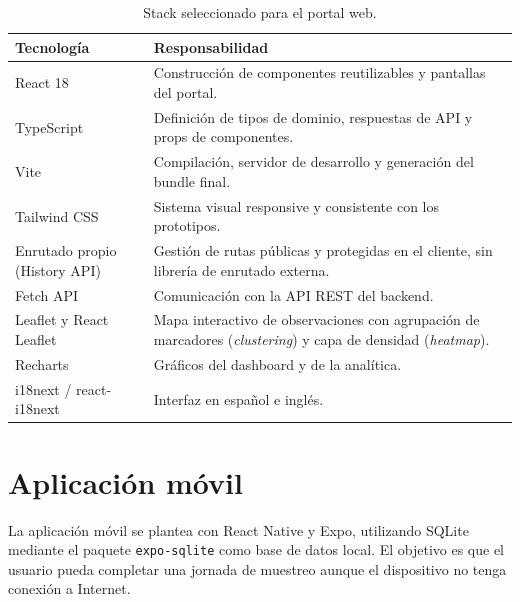 \begin{table}[H]
  \centering
  \caption{Stack seleccionado para el portal web.}
  \label{tab:stack_web}
  \begin{tabularx}{\textwidth}{lX}
    \toprule
    \textbf{Tecnología} & \textbf{Responsabilidad} \\
    \midrule
    React 18 & Construcción de componentes reutilizables y pantallas del portal. \\
    TypeScript & Definición de tipos de dominio, respuestas de API y props de componentes. \\
    Vite & Compilación, servidor de desarrollo y generación del bundle final. \\
    Tailwind CSS & Sistema visual responsive y consistente con los prototipos. \\
    Enrutado propio (History API) & Gestión de rutas públicas y protegidas en el cliente, sin librería de enrutado externa. \\
    Fetch API & Comunicación con la API REST del backend. \\
    Leaflet y React Leaflet & Mapa interactivo de observaciones con agrupación de marcadores (\textit{clustering}) y capa de densidad (\textit{heatmap}). \\
    Recharts & Gráficos del dashboard y de la analítica. \\
    i18next / react-i18next & Interfaz en español e inglés. \\
    \bottomrule
  \end{tabularx}
\end{table}

\section{Aplicación móvil}

La aplicación móvil se plantea con React Native y Expo, utilizando SQLite mediante
el paquete \texttt{expo-sqlite} como base de datos local. El objetivo es que el
usuario pueda completar una jornada de muestreo aunque el dispositivo no tenga
conexión a Internet.

